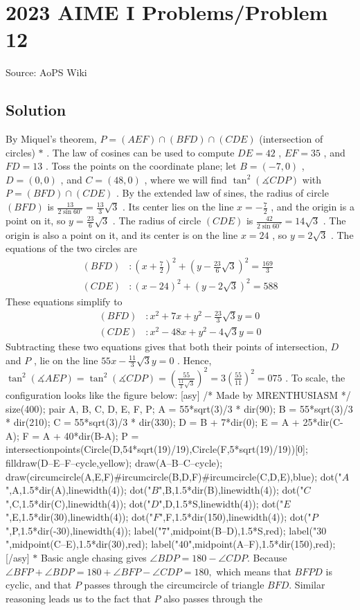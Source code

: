 \documentclass[12pt]{article}
\begin{document}
\section*{{2023 AIME I Problems/Problem 12}}
Source: AoPS Wiki

\subsection*{Solution}
By Miquel's theorem, $P=(AEF)\cap(BFD)\cap(CDE)$ (intersection of circles) $\text{*}$ . The law of cosines can be used to compute $DE=42$ , $EF=35$ , and $FD=13$ . Toss the points on the coordinate plane; let $B=(-7, 0)$ , $D=(0, 0)$ , and $C=(48, 0)$ , where we will find $\tan^{2}\left(\measuredangle CDP\right)$ with $P=(BFD)\cap(CDE)$ . By the extended law of sines, the radius of circle $(BFD)$ is $\frac{13}{2\sin 60^{\circ}}=\frac{13}{3}\sqrt{3}$ . Its center lies on the line $x=-\frac{7}{2}$ , and the origin is a point on it, so $y=\frac{23}{6}\sqrt{3}$ . The radius of circle $(CDE)$ is $\frac{42}{2\sin 60^{\circ}}=14\sqrt{3}$ . The origin is also a point on it, and its center is on the line $x=24$ , so $y=2\sqrt{3}$ . The equations of the two circles are \begin{align*}(BFD)&:\left(x+\tfrac{7}{2}\right)^{2}+\left(y-\tfrac{23}{6}\sqrt{3}\right)^{2}=\tfrac{169}{3} \\ (CDE)&:\left(x-24\right)^{2}+\left(y-2\sqrt{3}\right)^{2}=588\end{align*} These equations simplify to \begin{align*}(BFD)&:x^{2}+7x+y^{2}-\tfrac{23}{3}\sqrt{3}y=0 \\ (CDE)&: x^{2}-48x+y^{2}-4\sqrt{3}y=0\end{align*} Subtracting these two equations gives that both their points of intersection, $D$ and $P$ , lie on the line $55x-\tfrac{11}{3}\sqrt{3}y=0$ . Hence, $\tan^{2}\left(\measuredangle AEP\right)=\tan^{2}\left(\measuredangle CDP\right)=\left(\frac{55}{\tfrac{11}{3}\sqrt{3}}\right)^{2}=3\left(\tfrac{55}{11}\right)^{2}=\boxed{075}$ . To scale, the configuration looks like the figure below: [asy] /* Made by MRENTHUSIASM */ size(400); pair A, B, C, D, E, F, P; A = 55*sqrt(3)/3 * dir(90); B = 55*sqrt(3)/3 * dir(210); C = 55*sqrt(3)/3 * dir(330); D = B + 7*dir(0); E = A + 25*dir(C-A); F = A + 40*dir(B-A); P = intersectionpoints(Circle(D,54*sqrt(19)/19),Circle(F,5*sqrt(19)/19))[0]; filldraw(D--E--F--cycle,yellow); draw(A--B--C--cycle); draw(circumcircle(A,E,F)^^circumcircle(B,D,F)^^circumcircle(C,D,E),blue); dot("$A$",A,1.5*dir(A),linewidth(4)); dot("$B$",B,1.5*dir(B),linewidth(4)); dot("$C$",C,1.5*dir(C),linewidth(4)); dot("$D$",D,1.5*S,linewidth(4)); dot("$E$",E,1.5*dir(30),linewidth(4)); dot("$F$",F,1.5*dir(150),linewidth(4)); dot("$P$",P,1.5*dir(-30),linewidth(4)); label("$7$",midpoint(B--D),1.5*S,red); label("$30$",midpoint(C--E),1.5*dir(30),red); label("$40$",midpoint(A--F),1.5*dir(150),red); [/asy] $\text{*}$ Basic angle chasing gives $\angle BDP=180-\angle CDP.$ Because $\angle BFP+\angle BDP=180+\angle BFP-\angle CDP=180,$ which means that $BFPD$ is cyclic, and that $P$ passes through the circumcircle of triangle $BFD.$ Similar reasoning leads us to the fact that $P$ also passes through the 
\end{document}
